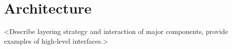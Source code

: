 
\section{Architecture}

<Describe layering strategy and interaction of major components,
provide examples of high-level interfaces.>








